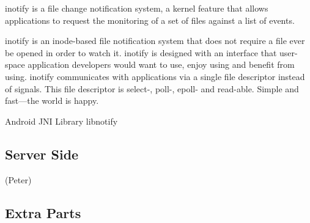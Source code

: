 inotify is a file change notification system, a kernel feature that allows applications to request the monitoring of a set of files against a list of events. 

inotify is an inode-based file notification system that does not require a file ever be opened in order to watch it. inotify is designed with an interface that user-space application developers would want to use, enjoy using and benefit from using. 
inotify communicates with applications via a single file descriptor instead of signals. This file descriptor is select-, poll-, epoll- and read-able. Simple and fast—the world is happy.


Android JNI Library libnotify



\subsection{Server Side}
(Peter)


\subsection{Extra Parts}